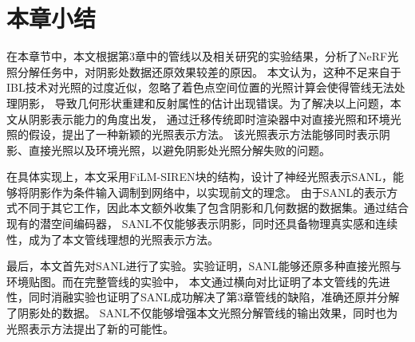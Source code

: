 \section{本章小结}

在本章节中，本文根据第3章中的管线以及相关研究的实验结果，分析了NeRF光照分解任务中，对阴影处数据还原效果较差的原因。
本文认为，这种不足来自于IBL技术对光照的过度近似，忽略了着色点空间位置的光照计算会使得管线无法处理阴影，
导致几何形状重建和反射属性的估计出现错误。为了解决以上问题，本文从阴影表示能力的角度出发，
通过迁移传统即时渲染器中对直接光照和环境光照的假设，提出了一种新颖的光照表示方法。
该光照表示方法能够同时表示阴影、直接光照以及环境光照，以避免阴影处光照分解失败的问题。

在具体实现上，本文采用FiLM-SIREN块的结构，设计了神经光照表示SANL，能够将阴影作为条件输入调制到网络中，以实现前文的理念。
由于SANL的表示方式不同于其它工作，因此本文额外收集了包含阴影和几何数据的数据集。通过结合现有的潜空间编码器，
SANL不仅能够表示阴影，同时还具备物理真实感和连续性，成为了本文管线理想的光照表示方法。

最后，本文首先对SANL进行了实验。实验证明，SANL能够还原多种直接光照与环境贴图。而在完整管线的实验中，
本文通过横向对比证明了本文管线的先进性，同时消融实验也证明了SANL成功解决了第3章管线的缺陷，准确还原并分解了阴影处的数据。
SANL不仅能够增强本文光照分解管线的输出效果，同时也为光照表示方法提出了新的可能性。
